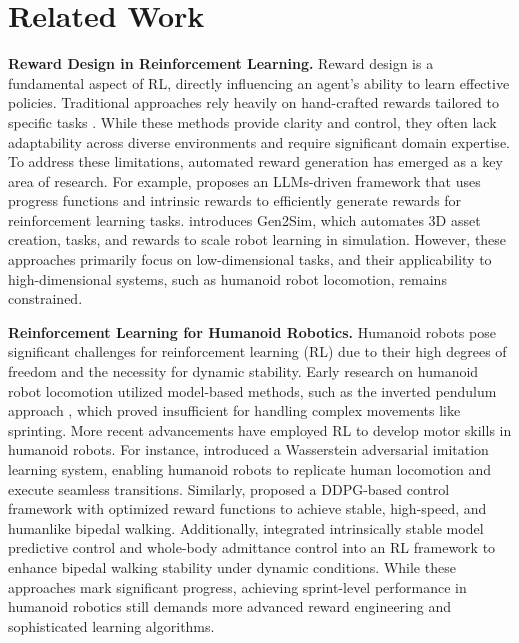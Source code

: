 \section{Related Work}
\label{Related_Work}

\textbf{Reward Design in Reinforcement Learning.}
Reward design is a fundamental aspect of RL, directly influencing an agent’s ability to learn effective policies. Traditional approaches rely heavily on hand-crafted rewards tailored to specific tasks \cite{mo2022managing}. While these methods provide clarity and control, they often lack adaptability across diverse environments and require significant domain expertise. To address these limitations, automated reward generation has emerged as a key area of research. For example, \cite{sarukkai2024automated} proposes an LLMs-driven framework that uses progress functions and intrinsic rewards to efficiently generate rewards for reinforcement learning tasks. \cite{katara2024gen2sim} introduces Gen2Sim, which automates 3D asset creation, tasks, and rewards to scale robot learning in simulation. However, these approaches primarily focus on low-dimensional tasks, and their applicability to high-dimensional systems, such as humanoid robot locomotion, remains constrained.

\textbf{Reinforcement Learning for Humanoid Robotics.}  
Humanoid robots pose significant challenges for reinforcement learning (RL) due to their high degrees of freedom and the necessity for dynamic stability. Early research on humanoid robot locomotion utilized model-based methods, such as the inverted pendulum approach \cite{nandula2021neurodynamic}, which proved insufficient for handling complex movements like sprinting. More recent advancements have employed RL to develop motor skills in humanoid robots. For instance, \cite{tang2024humanmimic} introduced a Wasserstein adversarial imitation learning system, enabling humanoid robots to replicate human locomotion and execute seamless transitions. Similarly, \cite{pei2024gait} proposed a DDPG-based control framework with optimized reward functions to achieve stable, high-speed, and humanlike bipedal walking. Additionally, \cite{figueroa2024reinforcement} integrated intrinsically stable model predictive control and whole-body admittance control into an RL framework to enhance bipedal walking stability under dynamic conditions. While these approaches mark significant progress, achieving sprint-level performance in humanoid robotics still demands more advanced reward engineering and sophisticated learning algorithms.

